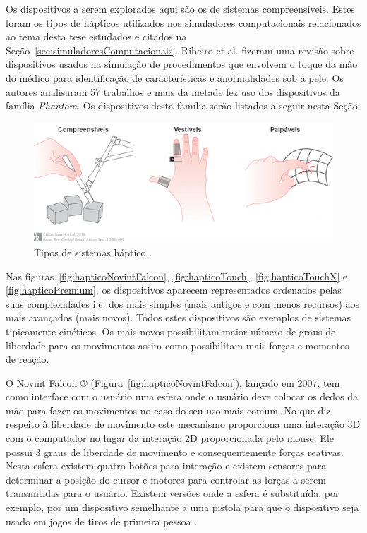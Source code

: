 Os dispositivos a serem explorados aqui são os de sistemas compreensíveis. Estes foram os tipos de hápticos utilizados nos simuladores computacionais relacionados ao tema desta tese estudados e citados na Seção~\ref{sec:simuladoresComputacionais}. Ribeiro et al. \cite{Ribeiro2016} fizeram uma revisão sobre dispositivos usados na simulação de procedimentos que envolvem o toque da mão do médico para identificação de características e anormalidades sob a pele. Os autores analisaram 57 trabalhos e mais da metade fez uso dos dispositivos da família \textit{Phantom}. Os dispositivos desta família serão listados a seguir nesta Seção.

\begin{figure}[ht!]
    \centering
    \includegraphics[width=0.8\linewidth]{capitulos/figuras/tipos.hapticos-portugues.png}
    \caption{Tipos de sistemas háptico \cite{Culbertson2018}.}
    \label{fig:tiposHapticos}
\end{figure}

Nas figuras~\ref{fig:hapticoNovintFalcon}, \ref{fig:hapticoTouch}, \ref{fig:hapticoTouchX} e  \ref{fig:hapticoPremium}, os dispositivos aparecem representados ordenados pelas suas complexidades i.e. dos mais simples (mais antigos e com menos recursos) aos mais avançados (mais novos). Todos estes dispositivos são exemplos de sistemas tipicamente cinéticos. Os mais novos possibilitam maior número de graus de liberdade para os movimentos assim como possibilitam mais forças e momentos de reação. 

O Novint Falcon ® (Figura~\ref{fig:hapticoNovintFalcon}), lançado em 2007, tem como interface com o usuário uma esfera onde o usuário deve colocar os dedos da mão para fazer os movimentos no caso do seu uso mais comum. No que diz respeito à liberdade de movimento este mecanismo proporciona uma interação 3D com o computador no lugar da interação 2D proporcionada pelo mouse. Ele possui 3 graus de liberdade de movimento e consequentemente forças reativas. Nesta esfera existem quatro botões para interação e existem sensores para determinar a posição do cursor e motores para controlar as forças a serem transmitidas para o usuário. Existem versões onde a esfera é substituída, por exemplo, por um dispositivo semelhante a uma pistola para que o dispositivo seja usado em jogos de tiros de primeira pessoa \cite{VRS2017}. 

